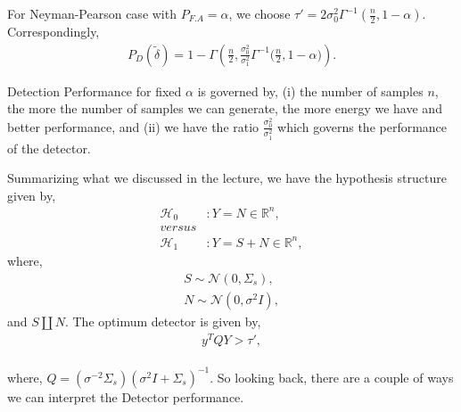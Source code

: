\documentclass[a4paper,english,12pt]{article}
\begin{document}
\begin{exmp}
For Neyman-Pearson case with $P_{F.A}=\alpha$, we choose $\tau'= 2\sigma_{0}^{2}\Gamma^{-1}\left(\frac{n}{2},1-\alpha\right)$. Correspondingly,
\begin{align*}
 	P_D(\tilde{\delta})=1 - \Gamma\left(\frac{n}{2},\frac{\sigma_0^2}{\sigma_1^2}\Gamma^{-1}\bigg(\frac{n}{2},1-\alpha\bigg)\right).
\end{align*}
\begin{note}
 Detection Performance for fixed $\alpha$ is governed by, (i) the number of samples $n$, the more the number of samples we can generate, the more energy we have and better performance, and (ii) we have the ratio $\frac{\sigma_0^2}{\sigma_1^2}$ which governs the performance of the detector.
\end{note}
\end{exmp}
Summarizing what we discussed in the lecture, we have the hypothesis structure given by,
\begin{align*}
 \mathcal{H}_0 &: Y = N \in \mathbb{R}^n,\\
 versus\\
 \mathcal{H}_1 &: Y = S+N \in \mathbb{R}^n, 
\end{align*}
 where,  
 \begin{align*}  
 S\sim \mathcal{N}(0,\Sigma_s),\\
 N\sim \mathcal{N}(0,\sigma^2I),
 \end{align*} 
 and $S\amalg N$. The optimum detector is given by,
\begin{align*}
       y^TQY>\tau',
\end{align*}\\
where, $Q =(\sigma^{-2}\Sigma_s)(\sigma^{2}I+\Sigma_s)^{-1}$. So looking back, there are a couple of ways we can interpret the Detector performance.
\end{document}

